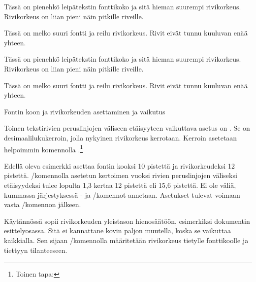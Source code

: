\begin{esimerkki}
\begin{koodilohko}
  \fontsize{10pt}{12pt}\selectfont Tässä on pienehkö leipätekstin
  fonttikoko ja sitä hieman suurempi rivikorkeus. Rivikorkeus on
  liian pieni näin pitkille riveille.

  \fontsize{16pt}{25pt}\selectfont Tässä on melko suuri fontti ja
  reilu rivikorkeus. Rivit eivät tunnu kuuluvan enää yhteen.
\end{koodilohko}
\parbox{\linewidth}{%
  \linespread{1}
  \fontsize{10pt}{12pt}\selectfont Tässä on pienehkö leipätekstin
  fonttikoko ja sitä hieman suurempi rivikorkeus. Rivikorkeus on liian
  pieni näin pitkille riveille.

  \fontsize{16pt}{25pt}\selectfont Tässä on melko suuri fontti ja reilu
  rivikorkeus. Rivit eivät tunnu kuuluvan enää yhteen. }

\vspace{1ex}
\hrulefill
\vspace{2ex}

\caption{Fontin koon ja rivikorkeuden asettaminen ja vaikutus}
\label{esim:rivikorkeus}
\end{esimerkki}

Toinen tekstirivien peruslinjojen väliseen etäisyyteen vaikuttava asetus
on . Se on desimaalilukukerroin, jolla
nykyinen rivikorkeus kerrotaan. Kerroin asetetaan helpoimmin komennolla
.\footnote{Toinen tapa: }

\begin{koodilohkosis}
  \fontsize{10pt}{12pt} \linespread{1.3} \selectfont
\end{koodilohkosis}

Edellä oleva esimerkki asettaa fontin kooksi 10 pistettä ja
rivikorkeudeksi 12 pistettä. \-/komennolla
asetetun kertoimen vuoksi rivien peruslinjojen väliseksi etäisyydeksi
tulee lopulta 1,3 kertaa 12 pistettä eli 15,6 pistettä. Ei ole väliä,
kummassa järjestyksessä - ja \-/komennot annetaan. Asetukset tulevat voimaan vasta
\-/komennon jälkeen.

Käytännössä  sopii rivikorkeuden yleistason
hienosäätöön, esimerkiksi dokumentin esittely\-osassa. Sitä ei
kannattane kovin paljon muutella, koska se vaikuttaa kaikkialla. Sen
sijaan \-/komennolla määritetään rivikorkeus
tietylle fonttikoolle ja tiettyyn tilanteeseen.

